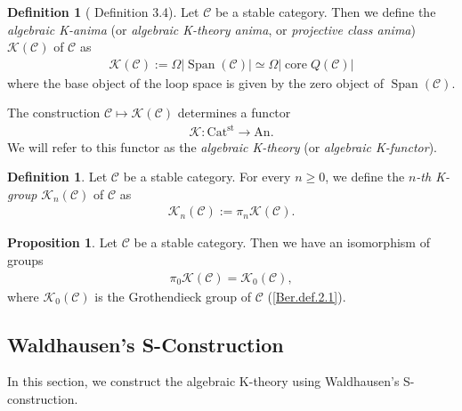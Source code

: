 \documentclass[a4paper,dvipdfmx,11pt,reqno]{amsart}
\newcommand{\C}{\mathcal{C}}
\newcommand{\K}{\mathcal{K}}
\DeclareMathOperator{\core}{core}
\DeclareMathOperator{\Span}{Span}
\newcommand{\An}{\mathrm{An}}
\newcommand{\Catst}{\mathrm{Cat^{st}}}
\theoremstyle{definition}
\newtheorem{definition}[theorem]{Definition}
\newtheorem{proposition}[theorem]{Proposition}
\begin{document}
\begin{definition}[\cite{HLS23} Definition 3.4] \label{HLS23.def.3.4}
  Let $\C$ be a stable category.
  Then we define the \textit{algebraic K-anima} (or \textit{algebraic K-theory anima}, or \textit{projective class anima}) $\K(\C)$ of $\C$ as 
  \begin{align*}
    \K(\C) := \Omega|\Span(\C)| \simeq \Omega|\core Q(\C)|
  \end{align*}
  where the base object of the loop space is given by the zero object of $\Span(\C)$.

  The construction $\C \mapsto \K(\C)$ determines a functor 
  \begin{align*}
    \K : \Catst \to \An. 
  \end{align*}
  We will refer to this functor as the \textit{algebraic K-theory} (or \textit{algebraic K-functor}).
\end{definition}

\begin{definition}
  Let $\C$ be a stable category.
  For every $n \geq 0$, we define the \textit{$n$-th K-group} $\K_{n}(\C)$ of $\C$ as 
  \begin{align*}
    \K_n(\C) := \pi_n\K(\C).
  \end{align*}
\end{definition}

\begin{proposition}
  Let $\C$ be a stable category.
  Then we have an isomorphism of groups
  \begin{align*}
    \pi_0\K(\C) = \K_0(\C),
  \end{align*}
  where $\K_0(\C)$ is the Grothendieck group of $\C$ (\cref{Ber.def.2.1}).
\end{proposition}

\subsection{Waldhausen's S-Construction}

In this section, we construct the algebraic K-theory using Waldhausen's S-construction. 
\end{document}
